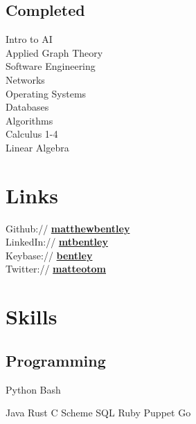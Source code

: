 \documentclass[letterpaper]{deedy-resume} %
\newcommand{\bul}{\textbullet{}}
\begin{document}
\begin{minipage}[t]{0.33\textwidth}
\subsection{Completed}

Intro to AI \\%
Applied Graph Theory \\%
Software Engineering \\%
Networks \\%
Operating Systems \\%
Databases \\%
Algorithms \\%
Calculus 1-4 \\%
Linear Algebra


\sectionspace %


\section{Links}

Github:// \href{https://github.com/matthewbentley}{\bf matthewbentley} \\
LinkedIn:// \href{https://www.linkedin.com/in/mtbentley}{\bf mtbentley} \\
Keybase:// \href{https://keybase.io/bentley}{\bf bentley} \\
Twitter:// \href{https://twitter.com/matteotom}{\bf matteotom} \\

\sectionspace %


\section{Skills}

\subsection{Programming}


Python \bul Bash


Java \bul Rust \bul C \bul Scheme \bul SQL \bul Ruby \bul Puppet \bul Go


\end{minipage}
\end{document}
